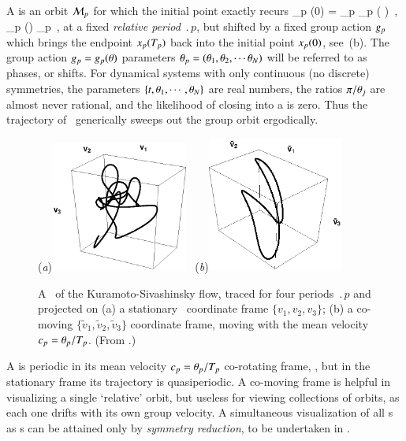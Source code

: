 \documentclass[preprint,number,sort&compress]{elsarticle}
\begin{document}
A {\em \rpo} is an orbit ${\cal M}_p$ for which the initial point
exactly recurs
\beq
\ssp_p (0) = \LieEl_p \ssp_p ( )
    \,,\qquad
\ssp_p (\tau) \in \pS_p
    \,,
\label{RPOrelper1}
\eeq
at a fixed {\em relative period} $\period{p}$, but shifted by
a fixed group action ${g_p}$ which brings the endpoint
$x_p ({T_{p}} ) $ back into the initial point $x_p
(0) $, see \,(b). The group action ${g_p}=
g_p({\bf \theta})$ parameters ${\bf \theta}_p =
({\bf \theta}_1,{\bf \theta}_2,\cdots{\bf \theta}_N)$ will be referred to as
phases, or shifts. For dynamical systems with only
continuous (no discrete) symmetries, the parameters
$\{t,{\bf \theta}_1,\cdots,{\bf \theta}_N\}$ are real numbers, the ratios
$\pi/{\bf \theta}_j$ are almost never rational, and the likelihood
of closing into a {\po} is {zero}. Thus the trajectory
of \rpo\ generically sweeps out the group orbit ergodically.

%
\begin{figure}[ht] \label{f:MeanVelocityFrame}
(\textit{a})\includegraphics[width=0.40\textwidth, clip=true]
                    {ks22rpo033.50_04.045E2.eps}
~(\textit{b})\includegraphics[width=0.40\textwidth, clip=true]
                     {ks22rpo033.50_04.045E2CM.eps}
\caption{
 A \rpo\ of the Kuramoto-Sivashinsky flow, traced for four periods
 $\period{p}$ and projected on
 (a) a stationary \statesp\ coordinate frame
 $\{v_1,v_2,v_3\}$;
 (b) a co-moving $\{\tilde{v}_1,\tilde{v}_2,\tilde{v}_3\}$
 coordinate frame, moving with the mean velocity
 $c_p={\bf \theta}_p/{T_{p}}$.
(From .)
}
\end{figure}
%
A \emph{\rpo} is periodic in its mean velocity
$c_p={\bf \theta}_p/{T_{p}}$ co-rotating frame,
, but in the stationary frame its
trajectory is quasiperiodic. A co-moving frame is helpful in
visualizing a single `relative' orbit, but useless for
viewing collections of orbits, as each one drifts with its
own group velocity. A simultaneous visualization of all \rpo
s as \po s {can  be attained} only by \emph{symmetry
reduction}, to be undertaken in .
\end{document}
